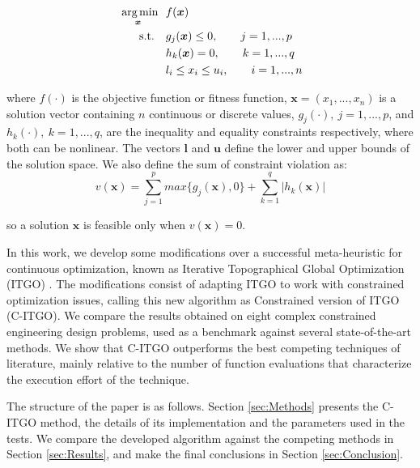 \begin{equation}\label{eq:func}
    \begin{aligned}
    \underset{\bm{x}}{\text{\fnt{10} arg\,min}} \ \ & f(\bm{x}) \\
    \text{s.t.} \quad & g_j(\bm{x}) \leq 0, \qquad j = 1, ..., p  \\
                      & h_k(\bm{x}) = 0, \qquad k = 1, ..., q  \\ 
                      & l_i \leq x_i \leq u_i, \qquad i = 1, ..., n 
    \end{aligned}
\end{equation}

\noindent
where $f(\cdot)$ is the objective function or fitness function, $\bm{x} = (x_1, ..., x_n)$ is a solution vector containing $n$ continuous or discrete values, $g_j(\cdot), \ j = 1, ..., p$, and $h_k(\cdot), \ k = 1, ..., q$, are the inequality and equality constraints respectively, where both can be nonlinear. The vectors $\bm{l}$ and $\bm{u}$ define the lower and upper bounds of the solution space. We also define the sum of constraint violation as: \\[-3em]

\begin{equation}\label{eq:viol}
    v(\bm{x}) = \sum_{j=1}^p max\{g_j(\bm{x}), 0\} + \sum_{k=1}^q |h_k(\bm{x})|
\end{equation}

\noindent
so a solution $\bm{x}$ is feasible only when $v(\bm{x}) = 0$. 

In this work, we develop some modifications over a successful meta-heuristic for continuous optimization, known as Iterative Topographical Global Optimization (ITGO) \citep{ITGO0}. The modifications consist of adapting ITGO to work with constrained optimization issues, calling this new algorithm as Constrained version of ITGO (C-ITGO). We compare the results obtained on eight complex constrained engineering design problems, used as a benchmark against several state-of-the-art methods. We show that C-ITGO outperforms the best competing techniques of literature, mainly relative to the number of function evaluations that characterize the execution effort of the technique.

The structure of the paper is as follows. Section \ref{sec:Methods} presents the C-ITGO method, the details of its implementation and the parameters used in the tests. We compare the developed algorithm against the competing methods in Section \ref{sec:Results}, and make the final conclusions in Section \ref{sec:Conclusion}.